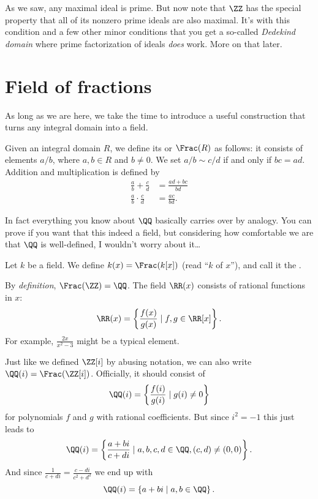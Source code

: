 As we saw, any maximal ideal is prime.
But now note that $\ZZ$ has the special property that
all of its nonzero prime ideals are also maximal.
It's with this condition and a few other minor conditions
that you get a so-called \emph{Dedekind domain}
where prime factorization of ideals \emph{does} work.
More on that later.

\section{Field of fractions}
As long as we are here, we take the time to introduce a useful
construction that turns any integral domain into a field.

\begin{definition}
	Given an integral domain $R$,
	we define its  or 
	$\Frac(R)$ as follows:
	it consists of elements $a / b$, where $a,b \in R$ and $b \neq 0$.
	We set $a / b \sim c / d$ if and only if $bc = ad$.
	Addition and multiplication is defined by
	\begin{align*}
		\frac ab + \frac cd &= \frac{ad+bc}{bd} \\
		\frac ab \cdot \frac cd &= \frac{ac}{bd}.
	\end{align*}
\end{definition}
In fact everything you know about $\QQ$ basically carries over by analogy.
You can prove if you want that this indeed a field, but
considering how comfortable we are that $\QQ$ is well-defined,
I wouldn't worry about it\dots

\begin{definition}
	Let $k$ be a field.
	We define $k(x) = \Frac(k[x])$
	(read ``$k$ of $x$''),
	and call it the .
\end{definition}

\begin{example}
	\listhack
	\begin{enumerate}[(a)]
		\ii By \emph{definition}, $\Frac(\ZZ) = \QQ$.
		\ii The field $\RR(x)$ consists of rational functions in $x$:
		\[ \RR(x) = \left\{ \frac{f(x)}{g(x)} \mid f,g \in \RR[x] \right\}. \]
		For example, $\frac{2x}{x^2-3}$ might be a typical element.
	\end{enumerate}
\end{example}

\begin{example}
	\label{ex:gaussian_rationals}
	Just like we defined $\ZZ[i]$ by abusing notation,
	we can also write $\QQ(i) = \Frac(\ZZ[i])$.
	Officially, it should consist of
	\[ \QQ(i) = \left\{ \frac{f(i)}{g(i)} \mid g(i) \neq 0 \right\} \]
	for polynomials $f$ and $g$ with rational coefficients.
	But since $i^2=-1$ this just leads to
	\[ \QQ(i) = \left\{ \frac{a+bi}{c+di} \mid a,b,c,d \in \QQ,
		(c,d) \neq (0,0) \right\}. \]
	And since $\frac{1}{c+di} = \frac{c-di}{c^2+d^2}$ we end up with
	\[ \QQ(i) = \left\{ a+bi \mid a,b \in \QQ \right\}. \]
\end{example}


